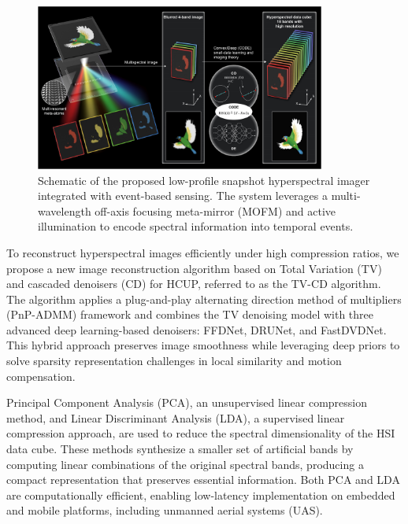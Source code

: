 \documentclass[conference]{IEEEtran}
\begin{document}
\begin{figure}[!t]
\centering
\includegraphics[width=0.85\textwidth]{HSI_EBS_system..png}
\caption{Schematic of the proposed low-profile snapshot hyperspectral imager integrated with event-based sensing. The system leverages a multi-wavelength off-axis focusing meta-mirror (MOFM) and active illumination to encode spectral information into temporal events.}
\label{fig:hs_imager}
\end{figure}

To reconstruct hyperspectral images efficiently under high compression ratios, we propose a new image reconstruction algorithm based on Total Variation (TV) and cascaded denoisers (CD) for HCUP, referred to as the TV-CD algorithm. The algorithm applies a plug-and-play alternating direction method of multipliers (PnP-ADMM) framework and combines the TV denoising model with three advanced deep learning-based denoisers: FFDNet, DRUNet, and FastDVDNet. This hybrid approach preserves image smoothness while leveraging deep priors to solve sparsity representation challenges in local similarity and motion compensation.

Principal Component Analysis (PCA), an unsupervised linear compression method, and Linear Discriminant Analysis (LDA), a supervised linear compression approach, are used to reduce the spectral dimensionality of the HSI data cube. These methods synthesize a smaller set of artificial bands by computing linear combinations of the original spectral bands, producing a compact representation that preserves essential information. Both PCA and LDA are computationally efficient, enabling low-latency implementation on embedded and mobile platforms, including unmanned aerial systems (UAS).
\end{document}
